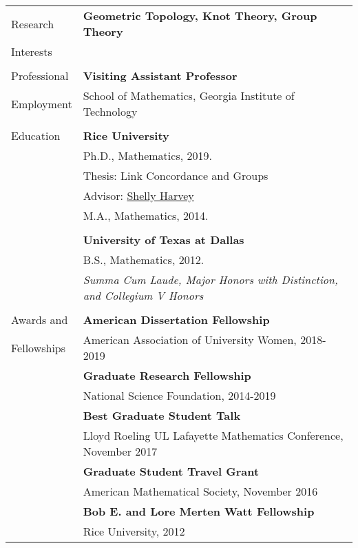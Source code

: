 \documentclass[letterpaper,11pt,oneside]{article}
\begin{document}
\noindent \begin{tabular}{@{} l l}

 \Large{Research }    & \textbf{Geometric Topology, Knot Theory, Group Theory} \\
   \Large{Interests}   & \\
        & \\

 \Large{Professional}    & \textbf{Visiting Assistant Professor} \\
     \Large{Employment}   
     & School of Mathematics, Georgia Institute of Technology \\
    
     & \\
 \Large{Education}    & \textbf{Rice University} \\
     & Ph.D., Mathematics, 2019. \\
          & Thesis:  Link Concordance and Groups \\
     & Advisor: \href{www.math.rice.edu/~shelly}{Shelly Harvey} \\

     & M.A., Mathematics, 2014. \\
     & \\
     & \textbf{University of Texas at Dallas} \\
     & B.S., Mathematics, 2012. \\
      & \sl{Summa Cum Laude, Major Honors with Distinction, and Collegium V Honors} \\
     & \\
      \Large{Awards and }    & \textbf{American Dissertation Fellowship} \\
  \Large{Fellowships}   & American Association of University Women, 2018-2019 \\
 
     & \textbf{Graduate Research Fellowship} \\
     & National Science Foundation, 2014-2019 \\
 
     
         & \textbf{Best Graduate Student Talk} \\
     & Lloyd Roeling UL Lafayette Mathematics Conference, November 2017 \\
  
      & \textbf{Graduate Student Travel Grant} \\
     & American Mathematical Society, November 2016 \\
     
        & \textbf{Bob E. and Lore Merten Watt Fellowship } \\
     & Rice University, 2012 \\
     

\end{tabular}
\end{document}

